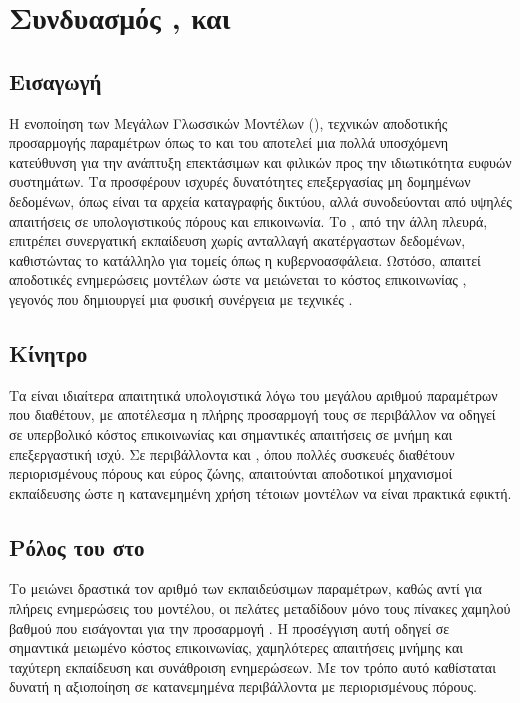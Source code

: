 \section{Συνδυασμός ,  και }

\subsection{Εισαγωγή}

Η ενοποίηση των Μεγάλων Γλωσσικών Μοντέλων (), τεχνικών αποδοτικής προσαρμογής παραμέτρων όπως το  και του  αποτελεί μια πολλά υποσχόμενη κατεύθυνση για την ανάπτυξη επεκτάσιμων και φιλικών προς την ιδιωτικότητα ευφυών συστημάτων. Τα  προσφέρουν ισχυρές δυνατότητες επεξεργασίας μη δομημένων δεδομένων, όπως είναι τα αρχεία καταγραφής δικτύου, αλλά συνοδεύονται από υψηλές απαιτήσεις σε υπολογιστικούς πόρους και επικοινωνία. Το , από την άλλη πλευρά, επιτρέπει συνεργατική εκπαίδευση χωρίς ανταλλαγή ακατέργαστων δεδομένων, καθιστώντας το κατάλληλο για τομείς όπως η κυβερνοασφάλεια. Ωστόσο, απαιτεί αποδοτικές ενημερώσεις μοντέλων ώστε να μειώνεται το κόστος επικοινωνίας \cite{mcmahan2017communication}, γεγονός που δημιουργεί μια φυσική συνέργεια με τεχνικές .

\subsection{Κίνητρο}

Τα  είναι ιδιαίτερα απαιτητικά υπολογιστικά λόγω του μεγάλου αριθμού παραμέτρων που διαθέτουν, με αποτέλεσμα η πλήρης προσαρμογή τους σε περιβάλλον  να οδηγεί σε υπερβολικό κόστος επικοινωνίας και σημαντικές απαιτήσεις σε μνήμη και επεξεργαστική ισχύ. Σε περιβάλλοντα  και , όπου πολλές συσκευές διαθέτουν περιορισμένους πόρους και εύρος ζώνης, απαιτούνται αποδοτικοί μηχανισμοί εκπαίδευσης ώστε η κατανεμημένη χρήση τέτοιων μοντέλων να είναι πρακτικά εφικτή.

\subsection{Ρόλος του  στο }

Το  μειώνει δραστικά τον αριθμό των εκπαιδεύσιμων παραμέτρων, καθώς αντί για πλήρεις ενημερώσεις του μοντέλου, οι πελάτες μεταδίδουν μόνο τους πίνακες χαμηλού βαθμού που εισάγονται για την προσαρμογή \cite{hu2021lora}. Η προσέγγιση αυτή οδηγεί σε σημαντικά μειωμένο κόστος επικοινωνίας, χαμηλότερες απαιτήσεις μνήμης και ταχύτερη εκπαίδευση και συνάθροιση ενημερώσεων. Με τον τρόπο αυτό καθίσταται δυνατή η αξιοποίηση  σε κατανεμημένα περιβάλλοντα με περιορισμένους πόρους.

